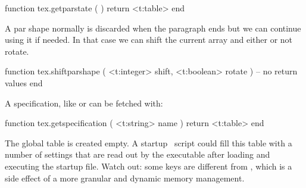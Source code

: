\starttyping[option=LUA]
function tex.getparstate ( )
    return <t:table>
end
\stoptyping

A par shape normally is discarded when the paragraph ends but we can continue
using it if needed. In that case we can shift the current array and either
or not rotate.

\starttyping[option=LUA]
function tex.shiftparshape (
    <t:integer> shift,
    <t:boolean> rotate
)
    -- no return values
end
\stoptyping

A specification, like \type {\parshape} or \type {\widowpenalties} can be fetched
with:

\starttyping[option=LUA]
function tex.getspecification ( <t:string> name )
    return <t:table>
end
\stoptyping

\stopsubsection

\stopsection

\startsection[title={The configuration}]

The global  table is created empty. A startup \LUA\ script could
fill this table with a number of settings that are read out by the executable
after loading and executing the startup file. Watch out: some keys are different
from \LUATEX, which is a side effect of a more granular and dynamic memory
management.

